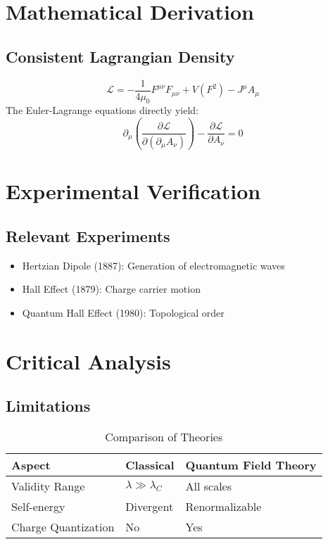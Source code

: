 \documentclass[12pt,a4paper]{article}
\begin{document}
	\section{Mathematical Derivation}
	\subsection{Consistent Lagrangian Density}
	\begin{equation}
		\mathcal{L} = -\frac{1}{4\mu_0}F^{\mu\nu}F_{\mu\nu} + V(F^2) - J^\mu A_\mu
	\end{equation}
	The Euler-Lagrange equations directly yield:
	\begin{equation}
		\partial_\mu\left(\frac{\partial\mathcal{L}}{\partial(\partial_\mu A_\nu)}\right) - \frac{\partial\mathcal{L}}{\partial A_\nu} = 0
	\end{equation}
	
	\section{Experimental Verification}
	\subsection{Relevant Experiments}
	\begin{itemize}
		\item Hertzian Dipole (1887): Generation of electromagnetic waves
		\item Hall Effect (1879): Charge carrier motion
		\item Quantum Hall Effect (1980): Topological order
	\end{itemize}
	
	\section{Critical Analysis}
	\subsection{Limitations}
	\begin{table}[h]
		\centering
		\begin{tabular}{@{}lll@{}}
			\toprule
			Aspect & Classical & Quantum Field Theory \\
			\midrule
			Validity Range & $\lambda \gg \lambda_C$ & All scales \\
			Self-energy & Divergent & Renormalizable \\
			Charge Quantization & No & Yes \\
			\bottomrule
		\end{tabular}
		\caption{Comparison of Theories}
	\end{table}
	
\end{document}

